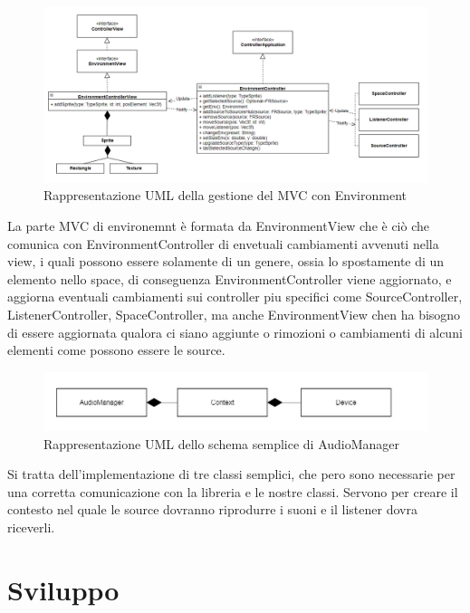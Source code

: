 \documentclass[a4paper,12pt]{report}
\begin{document}
%
\begin{figure}[H]
\centering{}
\includegraphics[width=\textwidth]{img/environment/EnvironmentMVC.png}
\caption{Rappresentazione UML della gestione del MVC con Environment}
\label{img:environmentmvc}
\end{figure}
La parte MVC di environemnt è formata da EnvironmentView che è ciò che comunica con EnvironmentController di envetuali cambiamenti avvenuti nella view, i quali possono essere solamente di un genere, ossia lo spostamente di un elemento nello space, di conseguenza EnvironmentController viene aggiornato, e aggiorna eventuali cambiamenti sui controller piu specifici come SourceController, ListenerController, SpaceController, ma anche EnvironmentView chen ha bisogno di essere aggiornata qualora ci siano aggiunte o rimozioni o cambiamenti di alcuni elementi come possono essere le source.
%
\begin{figure}[H]
\centering{}
\includegraphics[width=\textwidth]{img/environment/AudioManager.png}
\caption{Rappresentazione UML dello schema semplice di AudioManager}
\label{img:audiomanager}
\end{figure}
Si tratta dell'implementazione di tre classi semplici, che pero sono necessarie per una corretta comunicazione con la libreria e le nostre classi. Servono per creare il contesto nel quale le source dovranno riprodurre i suoni e il listener dovra riceverli.
%

\chapter{Sviluppo}
\end{document}
